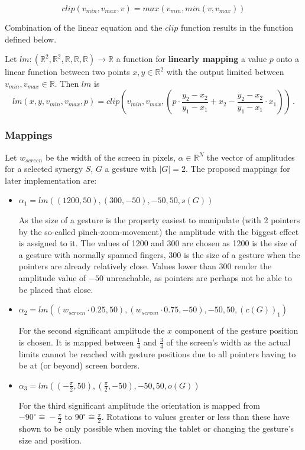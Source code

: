\begin{equation*}
clip(v_{min}, v_{max}, v) = max(v_{min}, min(v, v_{max}))
\end{equation*}

Combination of the linear equation and the $clip$ function results in the function defined below.

\begin{defn} Let $lm : (\mathbb{R}^2, \mathbb{R}^2, \mathbb{R}, \mathbb{R}, \mathbb{R}) \rightarrow \mathbb{R}$ a function for \textbf{linearly mapping} a value $p$ onto a linear function between two points $x, y \in \mathbb{R}^2$ with the output limited between $v_{min}, v_{max} \in \mathbb{R}$. Then $lm$ is
\begin{equation}
\label{eq:lm}
lm(x, y, v_{min}, v_{max}, p) = clip\left(v_{min}, v_{max}, \left( p \cdot \frac{y_2 - x_2}{y_1 - x_1} + x_2 - \frac{y_2 - x_2}{y_1 - x_1} \cdot x_1 \right)\right) \, .
\end{equation}
\end{defn}


\subsubsection{Mappings}

Let $w_{screen}$ be the width of the screen in pixels, $\alpha \in \mathbb{R}^N$ the vector of amplitudes for a selected synergy $S$, $G$ a gesture with $|G| = 2$. The proposed mappings for later implementation are:
\begin{itemize}
	\item $\alpha_1 = lm\left((1200, 50), (300, -50), -50, 50, s(G)\right)$
	
	As the size of a gesture is the property easiest to manipulate (with 2 pointers by the so-called pinch-zoom-movement) the amplitude with the biggest effect is assigned to it. The values of 1200 and 300 are chosen as 1200 is the size of a gesture with normally spanned fingers, 300 is the size of a gesture when the pointers are already relatively close. Values lower than 300 render the amplitude value of $-50$ unreachable, as pointers are perhaps not be able to be placed that close.
	
	\item $\alpha_2 = lm\left((w_{screen} \cdot 0.25, 50), (w_{screen} \cdot 0.75, -50), -50, 50, (c(G))_1\right)$
	
	For the second significant amplitude the $x$ component of the gesture position is chosen. It is mapped between $\frac{1}{4}$ and $\frac{3}{4}$ of the screen's width as the actual limits cannot be reached with gesture positions due to all pointers having to be at (or beyond) screen borders.
	
	\item $\alpha_3 = lm\left( \left( -\frac{\pi}{2}, 50 \right), \left( \frac{\pi}{2}, -50 \right), -50, 50, o(G) \right)$
	
	For the third significant amplitude the orientation is mapped from $-90^\circ \widehat{=} -\frac{\pi}{2}$ to $90^\circ \widehat{=} \frac{\pi}{2}$. Rotations to values greater or less than these have shown to be only possible when moving the tablet or changing the gesture's size and position.
\end{itemize}

